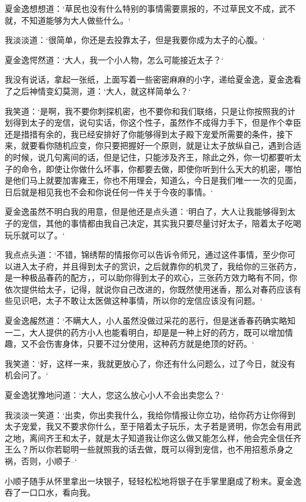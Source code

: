 夏金逸想想道：‘草民也没有什么特别的事情需要禀报的，不过草民文不成，武不就，不知道能够为大人做些什么。‘

我淡淡道：‘很简单，你还是去投靠太子，但是我要你成为太子的心腹。‘

夏金逸愕然道：‘大人，我一个小人物，怎么可能接近太子？‘

我没有说话，拿起一张纸，上面写着一些密密麻麻的小字，递给夏金逸，夏金逸看了之后神情变幻莫测，道：‘大人，就这样简单么？‘

我笑道：‘是啊，我不要你刺探机密，也不要你和我们联络，只是让你按照我的计划得到太子的宠信，说句实话，你这个性子，虽然作不成得力手下，但是作个幸臣还是措措有余的，我已经安排好了你能够得到太子殿下宠爱所需要的条件，接下来，就要看你随机应变，你只要把握好一个原则，就是让太子放纵自己，遇到合适的时候，说几句离间的话，但是记住，只能涉及齐王，除此之外，你一切都要听太子的命令，即使让你做什么坏事，你都要去做，即使你听到什么天大的机密，哪怕是他们马上就要加害雍王，你也不用理会，知道么，今日是我们唯一一次的见面，日后就是相见我也不会和你说任何一件关于今夜的事情。‘

夏金逸虽然不明白我的用意，但是他还是点头道：‘明白了，大人让我能够得到太子的宠信，其他的事情都由我自己决定，其实我只要尽量讨好太子，陪着太子吃喝玩乐就可以了。‘

我点点头道：‘不错，锦绣帮的情报你可以告诉令师兄，通过这件事情，至少你可以进入太子府，并且得到太子的赏识，之后就靠你的机灵了，我给你的三张药方，是一种极品春药的配方，，可以助你得到太子的欢心，三张药方效力略有不同，你依次提供给太子，记得，就说你自己改进的，你既然使用迷香，那么对春药应该有些见识吧，太子不敢让太医做这种事情，所以你的宠信应该没有问题。‘

夏金逸赧然道：‘不瞒大人，小人虽然没做过采花的恶行，但是迷香春药确实略知一二，大人提供的药方小人也能看明白，却是是一种上好的药方，既可以增加情趣，又不会伤害身体，只要不过分使用，这种药方就是绝顶的好药。‘

我笑道：‘好，这样一来，我就更放心了，你还有什么问题么，过了今日，就没有机会问了。‘

夏金逸犹豫地问道：‘大人，您这么放心小人不会出卖您么？‘

我淡淡一笑道：‘出卖，你出卖我什么，我给你情报让你立功，给你药方让你得到太子宠爱，我又不要求你什么，至于陪着太子玩乐，太子若是贤明，你怎会有用武之地，离间齐王和太子，就是太子知道我让你这么做又能怎么样，他会完全信任齐王么？所以你若聪明一些就照我的话去做，既可以得到宠信，也不用招惹杀身之祸，否则，小顺子--‘

小顺子随手从怀里拿出一块银子，轻轻松松地将银子在手掌里磨成了粉末。夏金逸吞了一口口水，看向我。

